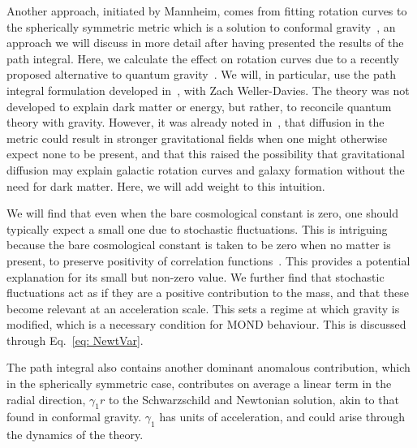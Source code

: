\documentclass[aps,pra,amsmath,amssymb,amsthm,floatfix,nofootinbib,notitlepage,superscriptaddress,10pt]{revtex4-2}
\begin{document}
Another approach, initiated by Mannheim, comes from fitting rotation curves to the spherically symmetric metric which is a solution to conformal gravity~\cite{mannheim1997galactic,mannheim1989exact,mannheim2012fitting}, an approach we will discuss in more detail after having presented the results of the path integral. 
Here, we calculate the effect on rotation curves due to a recently proposed alternative to quantum gravity~\cite{oppenheim2018post,oppenheim2023covariant}. We will, in particular, use the path integral formulation developed in~\cite{oppenheim2023path,oppenheim2023covariant}, with Zach Weller-Davies.  
The theory was not developed to explain dark matter or energy, but rather, to reconcile quantum theory with gravity. However, it was already noted in~\cite{oppenheim2018post}, that diffusion in the metric could result in stronger gravitational fields when one might otherwise expect none to be present, and that this raised the possibility that gravitational diffusion may explain galactic rotation curves and galaxy formation without the need for dark matter. Here, we will add weight to this intuition. 

We will find that even when the bare cosmological constant is zero, one should typically expect a small one due to stochastic fluctuations. This is intriguing because the bare cosmological constant is taken to be zero when no matter is present, to preserve positivity of correlation functions~\cite{grudka2023renormalisable}. This provides a potential explanation for its small but non-zero value. 
We further find that stochastic fluctuations act as if they are a positive contribution to the mass, and that these become relevant at an acceleration scale. This sets a regime at which gravity is modified, which is a necessary condition for MOND behaviour.  This is discussed through Eq.~\eqref{eq: NewtVar}. 

The path integral also contains another dominant anomalous contribution, which in the spherically symmetric case, contributes on average a linear term in the radial direction, $\gamma_1 r$ to the Schwarzschild and Newtonian solution, akin to that found in conformal gravity. $\gamma_1$ has units of acceleration, and could arise through the dynamics of the theory.
 
\end{document}
